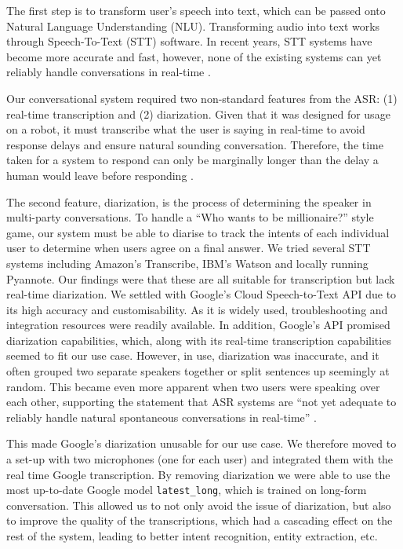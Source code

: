\documentclass[hidelinks, 11pt]{article}
\begin{document}
The first step is to transform user's speech into text, which can be passed onto Natural Language Understanding (NLU). Transforming audio into text works through Speech-To-Text (STT) software. In recent years, STT systems have become more accurate and fast, however, none of the existing systems can yet reliably handle conversations in real-time \cite{addlesee_comprehensive_2020}.

Our conversational system required two non-standard features from the ASR: (1) real-time transcription and (2) diarization. Given that it was designed for usage on a robot, it must transcribe what the user is saying in real-time to avoid response delays and ensure natural sounding conversation. Therefore, the time taken for a system to respond can only be marginally longer than the delay a human would leave before responding \cite{Miller_1968}.

The second feature, diarization, is the process of determining the speaker in multi-party conversations. To handle a ``Who wants to be millionaire?'' style game, our system must be able to diarise to track the intents of each individual user to determine when users agree on a final answer. We tried several STT systems including Amazon's Transcribe, IBM's Watson and locally running Pyannote. Our findings were that these are all suitable for transcription but lack real-time diarization. We settled with Google's Cloud Speech-to-Text API due to its high accuracy and customisability. As it is widely used, troubleshooting and integration resources were readily available. In addition, Google's API promised diarization capabilities, which, along with its real-time transcription capabilities seemed to fit our use case. However, in use, diarization was inaccurate, and it often grouped two separate speakers together or split sentences up seemingly at random. This became even more apparent when two users were speaking over each other, supporting the statement that ASR systems are ``not yet adequate to reliably handle natural spontaneous conversations in real-time'' \cite{addlesee_comprehensive_2020}.

This made Google's diarization unusable for our use case. We therefore moved to a set-up with two microphones (one for each user) and integrated them with the real time Google transcription. By removing diarization we were able to use the most up-to-date Google model \verb|latest_long|, which is trained on long-form conversation. This allowed us to not only avoid the issue of diarization, but also to improve the quality of the transcriptions, which had a cascading effect on the rest of the system, leading to better intent recognition, entity extraction, etc.
\end{document}
